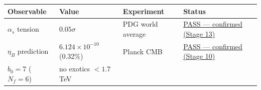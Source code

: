 \documentclass[
  11pt,
]{article}
\begin{document}
\begin{longtable}[]{@{}llll@{}}
\toprule
\begin{minipage}[b]{0.22\columnwidth}\raggedright
Observable\strut
\end{minipage} & \begin{minipage}[b]{0.22\columnwidth}\raggedright
Value\strut
\end{minipage} & \begin{minipage}[b]{0.22\columnwidth}\raggedright
Experiment\strut
\end{minipage} & \begin{minipage}[b]{0.22\columnwidth}\raggedright
Status\strut
\end{minipage}\tabularnewline
\midrule
\endhead
\begin{minipage}[t]{0.22\columnwidth}\raggedright
\(\alpha_s\) tension\strut
\end{minipage} & \begin{minipage}[t]{0.22\columnwidth}\raggedright
\(0.05\sigma\)\strut
\end{minipage} & \begin{minipage}[t]{0.22\columnwidth}\raggedright
PDG world average\strut
\end{minipage} & \begin{minipage}[t]{0.22\columnwidth}\raggedright
\protect\hyperlink{313-stage-13--nlo-precision--error-budget}{PASS ---
confirmed (Stage 13)}\strut
\end{minipage}\tabularnewline
\begin{minipage}[t]{0.22\columnwidth}\raggedright
\(\eta_B\) prediction\strut
\end{minipage} & \begin{minipage}[t]{0.22\columnwidth}\raggedright
\(6.124 \times 10^{-10}\) (0.32\%)\strut
\end{minipage} & \begin{minipage}[t]{0.22\columnwidth}\raggedright
Planck CMB\strut
\end{minipage} & \begin{minipage}[t]{0.22\columnwidth}\raggedright
\protect\hyperlink{310-stage-10--qcd-route-to-newtons-constant}{PASS ---
confirmed (Stage 10)}\strut
\end{minipage}\tabularnewline
\begin{minipage}[t]{0.22\columnwidth}\raggedright
\(b_0 = 7\) (\(N_f = 6\))\strut
\end{minipage} & \begin{minipage}[t]{0.22\columnwidth}\raggedright
no exotics \(< 1.7\) TeV\strut

\end{minipage}
\end{longtable}
\end{document}
